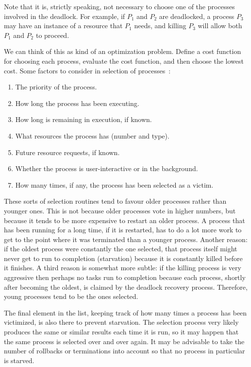 Note that it is, strictly speaking, not necessary to choose one of the processes involved in the deadlock. For example, if $P_{1}$ and $P_{2}$ are deadlocked, a process $P_{3}$  may have an instance of a resource that $P_{1}$ needs, and killing $P_{3}$ will allow both $P_{1}$ and $P_{2}$ to proceed.

We can think of this as kind of an optimization problem. Define a cost function for choosing each process, evaluate the cost function, and then choose the lowest cost. Some factors to consider in selection of processes~\cite{osc}:

\begin{enumerate}
	\item The priority of the process.
	\item How long the process has been executing.
	\item How long is remaining in execution, if known.
	\item What resources the process has (number and type).
	\item Future resource requests, if known.
	\item Whether the process is user-interactive or in the background.
	\item How many times, if any, the process has been selected as a victim.
\end{enumerate}

These sorts of selection routines tend to favour older processes rather than younger ones. This is not because older processes vote in higher numbers, but because it tends to be more expensive to restart an older process. A process that has been running for a long time, if it is restarted, has to do a lot more work to get to the point where it was terminated than a younger process. Another reason: if the oldest process were constantly the one selected, that process itself might never get to run to completion (starvation) because it is constantly killed before it finishes. A third reason is somewhat more subtle: if the killing process is very aggressive then perhaps no tasks run to completion because each process, shortly after becoming the oldest, is claimed by the deadlock recovery process. Therefore, young processes tend to be the ones selected.

The final element in the list, keeping track of how many times a process has been victimized, is also there to prevent starvation. The selection process very likely produces the same or similar results each time it is run, so it may happen that the same process is selected over and over again. It may be advisable to take the number of rollbacks or terminations into account so that no process in particular is starved.

